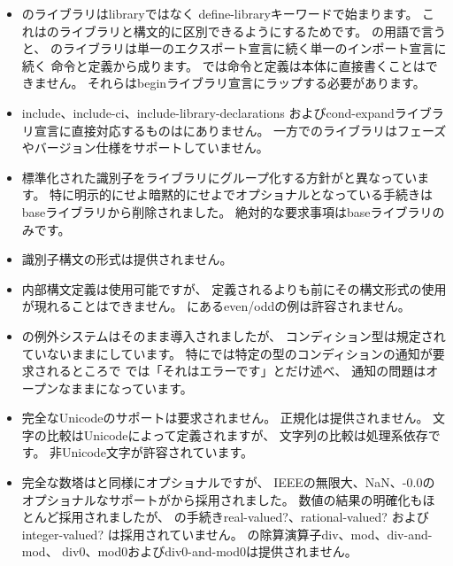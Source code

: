 \begin{itemize}
\item \rsevenrs{}のライブラリは{\cf library}ではなく
{\cf define-\+library}キーワードで始まります。
これは\rsixrs{}のライブラリと構文的に区別できるようにするためです。
\rsevenrs{}の用語で言うと、
\rsixrs{}のライブラリは単一のエクスポート宣言に続く単一のインポート宣言に続く
命令と定義から成ります。
\rsevenrs{}では命令と定義は本体に直接書くことはできません。
それらは{\cf begin}ライブラリ宣言にラップする必要があります。

\item {\cf include}、{\cf include-\+ci}、{\cf include-\+library-\+declarations}
および{\cf cond-\+expand}ライブラリ宣言に直接対応するものは\rsixrs{}にありません。
一方で\rsevenrs{}のライブラリはフェーズやバージョン仕様をサポートしていません。

\item 標準化された識別子をライブラリにグループ化する方針が\rsixrs{}と異なっています。
特に明示的にせよ暗黙的にせよ\rfivers{}でオプショナルとなっている手続きは
baseライブラリから削除されました。
絶対的な要求事項はbaseライブラリのみです。

\item 識別子構文の形式は提供されません。

\item 内部構文定義は使用可能ですが、
定義されるよりも前にその構文形式の使用が現れることはできません。
\rsixrs{}にある{\cf even}/{\cf odd}の例は許容されません。

\item \rsixrs{}の例外システムはそのまま導入されましたが、
コンディション型は規定されていないままにしています。
特に\rsixrs{}では特定の型のコンディションの通知が要求されるところで
\rsevenrs{}では「それはエラーです」とだけ述べ、
通知の問題はオープンなままになっています。

\item 完全なUnicodeのサポートは要求されません。
正規化は提供されません。
文字の比較はUnicodeによって定義されますが、
文字列の比較は処理系依存です。
非Unicode文字が許容されています。

\item 完全な数塔は\rfivers{}と同様にオプショナルですが、
IEEEの無限大、NaN、{\mbox -0.0}のオプショナルなサポートが\rsixrs{}から採用されました。
数値の結果の明確化もほとんど採用されましたが、
\rsixrs{}の手続き{\cf real-valued?}、{\cf rational-valued?}
および{\cf integer-valued?} は採用されていません。
\rsixrs{}の除算演算子{\cf div}、{\cf mod}、{\cf div-\+and-\+mod}、
{\cf div0}、{\cf mod0}および{\cf div0-\+and-\+mod0}は提供されません。


\end{itemize}
